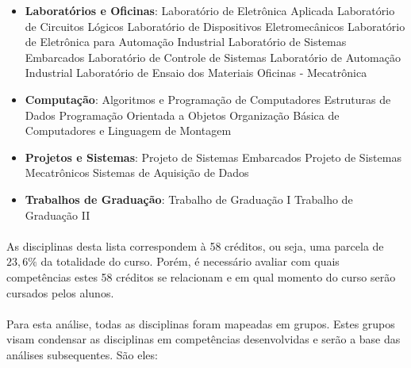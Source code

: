 \documentclass[12pt]{article} %
\begin{document}
\begin{itemize}
\setlength\itemsep{0.01mm}
\item\textbf{Laboratórios e Oficinas}: 
	\subitem Laboratório de Eletrônica Aplicada 
	\subitem Laboratório de Circuitos Lógicos 
	\subitem Laboratório de Dispositivos Eletromecânicos 
	\subitem Laboratório de Eletrônica para Automação Industrial 
	\subitem Laboratório de Sistemas Embarcados
	\subitem Laboratório de Controle de Sistemas
	\subitem Laboratório de Automação Industrial
	\subitem Laboratório de Ensaio dos Materiais
	\subitem Oficinas - Mecatrônica
\item\textbf{Computação}:
	\subitem Algoritmos e Programação de Computadores
	\subitem Estruturas de Dados
	\subitem Programação Orientada a Objetos
	\subitem Organização Básica de Computadores e Linguagem de Montagem
\item\textbf{Projetos e Sistemas}:
	\subitem Projeto de Sistemas Embarcados
	\subitem Projeto de Sistemas Mecatrônicos
	\subitem Sistemas de Aquisição de Dados
\item \textbf{Trabalhos de Graduação}:
	\subitem Trabalho de Graduação I 
	\subitem Trabalho de Graduação II
\end{itemize}

\paragraph{} As disciplinas desta lista correspondem à 58 créditos, ou seja, uma parcela de $23,6\%$ da totalidade do curso. Porém, é necessário avaliar com quais competências estes 58 créditos se relacionam e em qual momento do curso serão cursados pelos alunos.

\paragraph{} Para esta análise, todas as disciplinas foram mapeadas em grupos. Estes grupos visam condensar as disciplinas em competências desenvolvidas e serão a base das análises subsequentes. São eles:
\end{document}
